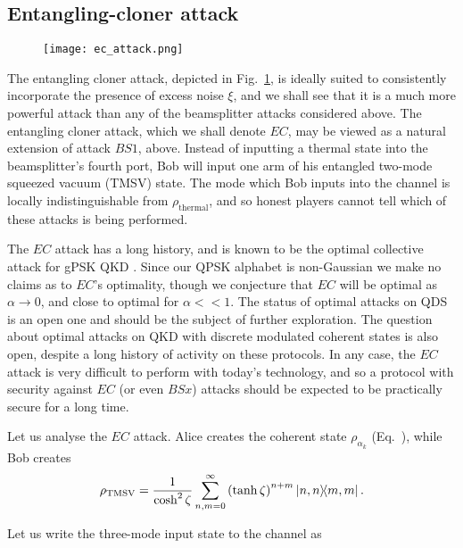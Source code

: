 \subsection{Entangling-cloner attack}
\begin{figure}[htp]
\centering
\texttt{[image: ec\_attack.png]}
\caption{\label{fig:ec_attack}}
\end{figure}
The entangling cloner attack, depicted in Fig.~\ref{fig:ec_attack}, is ideally suited to consistently incorporate the presence of excess noise $\xi$, and we shall see that it is a much more powerful attack than any of the beamsplitter attacks considered above. The entangling cloner attack, which we shall denote $EC$, may be viewed as a natural extension of attack $BS1$, above. Instead of inputting a thermal state into the beamsplitter's fourth port, Bob will input one arm of his entangled two-mode squeezed vacuum (TMSV) state. The mode which Bob inputs into the channel is locally indistinguishable from $\rho_{\text{thermal}}$, and so honest players cannot tell which of these attacks is being performed. 

The $EC$ attack has a long history, and is known to be the optimal collective attack for gPSK QKD . Since our QPSK alphabet is non-Gaussian we make no claims as to $EC$'s optimality, though we conjecture that $EC$ will be optimal as $\alpha \rightarrow 0$, and close to optimal for $\alpha << 1$. The status of optimal attacks on QDS is an open one and should be the subject of further exploration. The question about optimal attacks on QKD with discrete modulated coherent states is also open, despite a long history of activity on these protocols. In any case, the $EC$ attack is very difficult to perform with today's technology, and so a protocol with security against $EC$ (or even $BSx$) attacks should be expected to be practically secure for a long time.


Let us analyse the $EC$ attack. Alice creates the coherent state $\rho_{\alpha_k}$ (Eq.~), while Bob creates
\begin{equation}
\tmsv = \frac{1}{\cosh^2 \zeta}  \sum_{n, m=0}^\infty \left(\tanh\zeta\right)^{n+m} \dyad{n, n}{m, m}.
\end{equation}

\noindent Let us write the three-mode input state to the channel as


